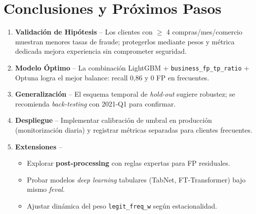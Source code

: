 \documentclass[a4paper,12pt]{article}
\begin{document}
\section{Conclusiones y Próximos Pasos}
\begin{enumerate}
    \item \textbf{Validación de Hipótesis} – Los clientes con $\geq$ 4 compras/mes/comercio muestran menores tasas de fraude; protegerlos mediante pesos y métrica dedicada mejora experiencia sin comprometer seguridad.
    \item \textbf{Modelo Óptimo} – La combinación LightGBM + \texttt{business\_fp\_tp\_ratio} + Optuna logra el mejor balance: recall 0,86 y 0 FP en frecuentes.
    \item \textbf{Generalización} – El esquema temporal de \textit{hold-out} sugiere robustez; se recomienda \textit{back-testing} con 2021-Q1 para confirmar.
    \item \textbf{Despliegue} – Implementar calibración de umbral en producción (monitorización diaria) y registrar métricas separadas para clientes frecuentes.
    \item \textbf{Extensiones} –
    \begin{itemize}
        \item Explorar \textbf{post-processing} con reglas expertas para FP residuales.
        \item Probar modelos \textit{deep learning} tabulares (TabNet, FT-Transformer) bajo mismo \textit{feval}.
        \item Ajustar dinámica del peso \texttt{legit\_freq\_w} según estacionalidad.
    \end{itemize}
\end{enumerate}
\end{document}
